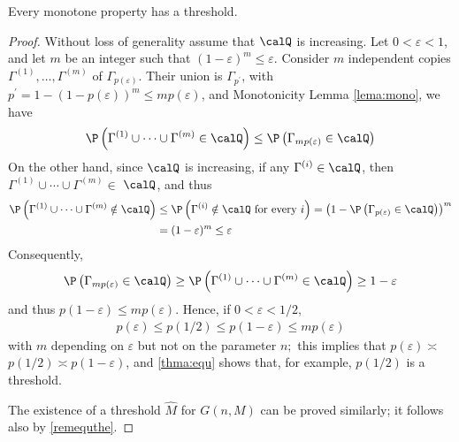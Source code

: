 \documentclass{article}
\begin{document}
\begin{thma}\label{thm:monothr}
  Every monotone property has a threshold.
\end{thma}
\begin{proof}
 Without loss of generality assume that $\calQ$ is increasing. Let $0<\varepsilon<1$, and let $m$ be an integer such that $(1-\varepsilon)^{m} \leq \varepsilon .$ Consider $m$ independent copies
$\Gamma^{(1)}, \ldots, \Gamma^{(m)}$ of $\Gamma_{p(\varepsilon)} .$ Their union is $\Gamma_{p^{\prime}}$, with $p^{\prime}=1-(1-p(\varepsilon))^{m} \leq m p(\varepsilon)$,
and {Monotonicity Lemma} \cref{lema:mono}, we have
\begin{align*}
\P \left(\Gamma^{(1)} \cup \cdots \cup \Gamma^{(m)} \in \calQ \right) \leq \P \left(\Gamma_{m p(\varepsilon)} \in \calQ \right)
\end{align*}
On the other hand, since $\calQ$ is increasing, if any $\Gamma^{(i)} \in \calQ$, then $\Gamma^{(1)} \cup \cdots \cup \Gamma^{(m)} \in$ $\calQ$, and thus
\begin{align*}
\begin{aligned}
\P \left(\Gamma^{(1)} \cup \cdots \cup \Gamma^{(m)} \notin \calQ \right) & \leq \P \left(\Gamma^{(i)} \notin \calQ \text { for every } i\right)=\left(1- \P \left(\Gamma_{p(\varepsilon)} \in \calQ \right)\right)^{m} \\
&=(1-\varepsilon)^{m} \leq \varepsilon
\end{aligned}
\end{align*}
Consequently,
\begin{align*}
\P \left(\Gamma_{m p(\varepsilon)} \in \calQ \right) \geq \P \left(\Gamma^{(1)} \cup \cdots \cup \Gamma^{(m)} \in \calQ \right) \geq 1-\varepsilon
\end{align*}
and thus $p(1-\varepsilon) \leq m p(\varepsilon) .$ Hence, if $0<\varepsilon<1 / 2$,
\begin{align}
p(\varepsilon) \leq p(1 / 2) \leq p(1-\varepsilon) \leq m p(\varepsilon)\label{eqttm}
\end{align}
with $m$ depending on $\varepsilon$ but not on the parameter $n ;$ this implies that $p(\varepsilon) \asymp$ $p(1 / 2) \asymp p(1-\varepsilon)$, and \cref{thma:equ} shows that, for example, $p(1 / 2)$ is a threshold.

The existence of a threshold $\widehat{M}$ for $G (n, M)$ can be proved similarly; it follows also by \cref{remequthe}.
\end{proof}
\end{document}
